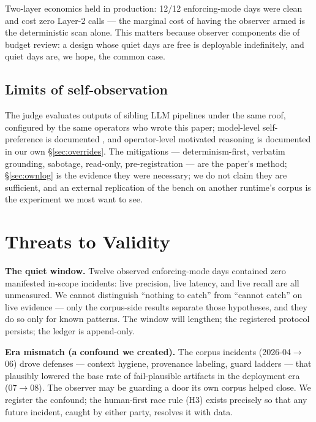 \documentclass[11pt]{article}
\begin{document}
Two-layer economics held in production: 12/12 enforcing-mode days were
clean and cost zero Layer-2 calls --- the marginal cost of having the
observer armed is the deterministic scan alone. This matters because
observer components die of budget review: a design whose quiet days are
free is deployable indefinitely, and quiet days are, we hope, the
common case.

\subsection{Limits of self-observation}
\label{sec:selfobs}

The judge evaluates outputs of sibling LLM pipelines under the same
roof, configured by the same operators who wrote this paper;
model-level self-preference is documented \cite{panickssery2024self},
and operator-level motivated reasoning is documented in our own
\S\ref{sec:overrides}. The mitigations --- determinism-first, verbatim
grounding, sabotage, read-only, pre-registration --- are the paper's
method; \S\ref{sec:ownlog} is the evidence they were necessary; we do
not claim they are sufficient, and an external replication of the bench
on another runtime's corpus is the experiment we most want to see.

\section{Threats to Validity}
\label{sec:threats}

\textbf{The quiet window.} Twelve observed enforcing-mode days
contained zero manifested in-scope incidents: live precision, live
latency, and live recall are all unmeasured. We cannot distinguish
``nothing to catch'' from ``cannot catch'' on live evidence --- only
the corpus-side results separate those hypotheses, and they do so only
for known patterns. The window will lengthen; the registered protocol
persists; the ledger is append-only.

\textbf{Era mismatch (a confound we created).} The corpus incidents
(2026-04$\rightarrow$06) drove defenses --- context hygiene, provenance
labeling, guard ladders --- that plausibly lowered the base rate of
fail-plausible artifacts in the deployment era (07$\rightarrow$08). The
observer may be guarding a door its own corpus helped close. We
register the confound; the human-first race rule (H3) exists precisely
so that any future incident, caught by either party, resolves it with
data.
\end{document}
